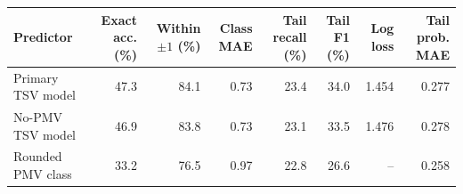 \begin{tabular}{lrrrrrrr}
\toprule
Predictor & Exact acc. (\%) & Within $\pm1$ (\%) & Class MAE & Tail recall (\%) & Tail F1 (\%) & Log loss & Tail prob. MAE \\
\midrule
Primary TSV model & 47.3 & 84.1 & 0.73 & 23.4 & 34.0 & 1.454 & 0.277 \\
No-PMV TSV model & 46.9 & 83.8 & 0.73 & 23.1 & 33.5 & 1.476 & 0.278 \\
Rounded PMV class & 33.2 & 76.5 & 0.97 & 22.8 & 26.6 & -- & 0.258 \\
\bottomrule
\end{tabular}
